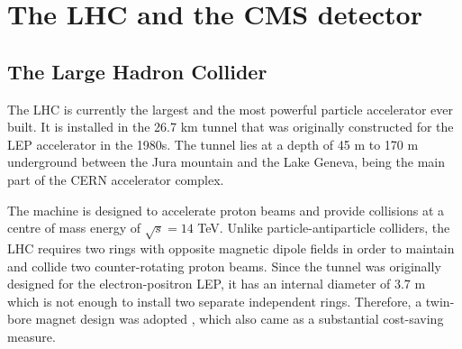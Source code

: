 \chapter{The LHC and the CMS detector}
\ifpdf
    \graphicspath{{03_Detector/plots/}}
\else
    \graphicspath{{03_Detector/plots/EPS/}{03_Detector/plots/}}
\fi

\section{The Large Hadron Collider}
The LHC \cite{LHC} is currently the largest and the most powerful particle accelerator ever built. It is installed in
the 26.7 km tunnel that was originally constructed for the LEP accelerator in the 1980s. The tunnel lies at a depth of
45 m to 170 m underground between the Jura mountain and the Lake Geneva, being the main part of the CERN accelerator
complex.

The machine is designed to accelerate proton beams and provide collisions at a centre of mass energy of $\sqrt s = 14$
TeV. Unlike particle-antiparticle colliders, the LHC requires two rings with opposite magnetic dipole fields in order to
maintain and collide two counter-rotating proton beams. Since the tunnel was originally designed for the
electron-positron LEP, it has an internal diameter of 3.7 m which is not enough to install two separate independent
rings. Therefore, a twin-bore magnet design was adopted \cite{Blewett}, which also came as a substantial cost-saving
measure.

